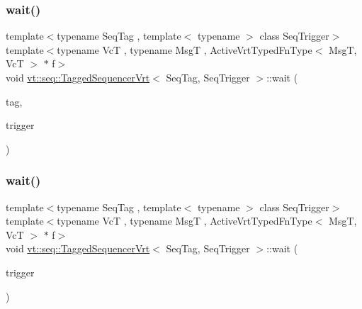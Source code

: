 \mbox{\label{structvt_1_1seq_1_1_tagged_sequencer_vrt_a8897cf74185e38e4d6b222bdab539f31}} 
\subsubsection{\texorpdfstring{wait()}{wait()}\hspace{0.1cm}{\footnotesize\ttfamily [1/2]}}
{\footnotesize\ttfamily template$<$typename Seq\+Tag , template$<$ typename $>$ class Seq\+Trigger$>$ \\
template$<$typename VcT , typename MsgT , Active\+Vrt\+Typed\+Fn\+Type$<$ Msg\+T, Vc\+T $>$ $\ast$ f$>$ \\
void \hyperlink{structvt_1_1seq_1_1_tagged_sequencer_vrt}{vt\+::seq\+::\+Tagged\+Sequencer\+Vrt}$<$ Seq\+Tag, Seq\+Trigger $>$\+::wait (\begin{DoxyParamCaption}\item[{\hyperlink{namespacevt_a84ab281dae04a52a4b243d6bf62d0e52}{Tag\+Type} const \&}]{tag,  }\item[{\hyperlink{structvt_1_1seq_1_1_tagged_sequencer_a4b015f2f7d3197a66af5576f0e63a834}{Seq\+Trigger\+Type}$<$ MsgT, VcT $>$}]{trigger }\end{DoxyParamCaption})}

\mbox{\label{structvt_1_1seq_1_1_tagged_sequencer_vrt_a88706e19289453ba99602e50dff901dd}} 
\subsubsection{\texorpdfstring{wait()}{wait()}\hspace{0.1cm}{\footnotesize\ttfamily [2/2]}}
{\footnotesize\ttfamily template$<$typename Seq\+Tag , template$<$ typename $>$ class Seq\+Trigger$>$ \\
template$<$typename VcT , typename MsgT , Active\+Vrt\+Typed\+Fn\+Type$<$ Msg\+T, Vc\+T $>$ $\ast$ f$>$ \\
void \hyperlink{structvt_1_1seq_1_1_tagged_sequencer_vrt}{vt\+::seq\+::\+Tagged\+Sequencer\+Vrt}$<$ Seq\+Tag, Seq\+Trigger $>$\+::wait (\begin{DoxyParamCaption}\item[{\hyperlink{structvt_1_1seq_1_1_tagged_sequencer_a4b015f2f7d3197a66af5576f0e63a834}{Seq\+Trigger\+Type}$<$ MsgT, VcT $>$}]{trigger }\end{DoxyParamCaption})}

